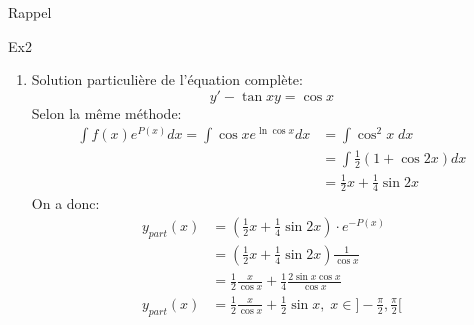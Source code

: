 \begin{parag}{Rappel}
\begin{subparag}{Ex2}
\begin{enumerate}
\begin{align*}
                &\underbrace{=}_{\int \frac{du}{u}} \int \frac{d(\cos x)}{\cos x} = \ln |\cos x| \\
                &\implies P(x) = \ln (\cos x) \text{ sur } ]-\frac{\pi}{2}, \frac{\pi}{2}[
            \end{align*}
            On a donc:
            \[y_{hom}(x) = Ce^{-P(x)} = Ce^{-\ln \cos x} = \frac{C}{\cos x}, x \in ]-\frac{\pi}{2}, \frac{\pi}{2}[, C \in \R\]
            \\
            \textbf{Vérification:}
            \begin{align*}
                -\frac{C}{\cos^2x}\cdot (-\sin x) - \tan x \cdot \frac{C}{\cos x} = C\frac{\sin x}{\cos^2 x} - C\frac{\sin x}{\cos^2 x} = 0
            \end{align*}
            \item Solution particulière de l'équation complète:
            \[y' - \tan x y = \cos x\]
            Selon la même méthode:
            \begin{align*}
                \int f(x) e^{P(x)}dx = \int \cos x e^{\ln \cos x} dx &= \int \cos^2 x \;dx \\
                &= \int \frac{1}{2}(1 + \cos 2x) dx \\
                &= \frac{1}{2}x + \frac{1}{4}\sin 2x
            \end{align*}
            On a donc:
            \begin{align*}
            y_{part}(x)& = (\frac{1}{2}x + \frac{1}{4}\sin 2x)\cdot e^{-P(x)} \\&=
            (\frac{1}{2}x + \frac{1}{4}\sin 2x)\frac{1}{\cos x}\\
            &= \frac{1}{2}\frac{x}{\cos x} + \frac{1}{4}\frac{2\sin x \cos x}{\cos x} \\
            y_{part}(x) &= \frac{1}{2}\frac{x}{\cos x} + \frac{1}{2}\sin x, \; x \in ]-\frac{\pi}{2}, \frac{\pi}{2}[
            \end{align*}
            
        \end{enumerate}
    \end{subparag}
\end{parag}

